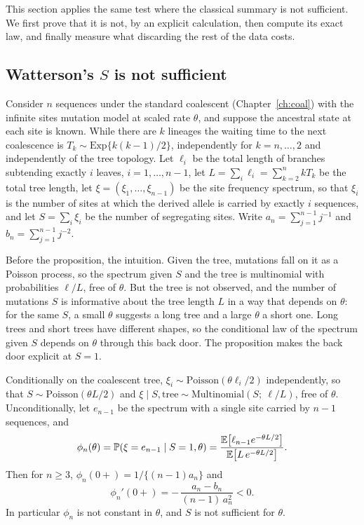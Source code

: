 This section applies the same test where the classical summary is not sufficient. We first
prove that it is not, by an explicit calculation, then compute its exact law, and finally
measure what discarding the rest of the data costs.

\subsection{Watterson's $S$ is not sufficient}

Consider $n$ sequences under the standard coalescent (Chapter~\ref{ch:coal}) with the
infinite sites mutation model at scaled rate $\theta$, and suppose the ancestral state at each
site is known. While there are $k$ lineages the waiting time to the next coalescence is
$T_k\sim\mathrm{Exp}\{k(k-1)/2\}$, independently for $k=n,\dots,2$ and independently of the
tree topology. Let $\ell_i$ be the total length of branches subtending exactly $i$ leaves,
$i=1,\dots,n-1$, let $L=\sum_i \ell_i=\sum_{k=2}^n kT_k$ be the total tree length, let
$\xi=(\xi_1,\dots,\xi_{n-1})$ be the site frequency spectrum, so that $\xi_i$ is the number of
sites at which the derived allele is carried by exactly $i$ sequences, and let
$S=\sum_i\xi_i$ be the number of segregating sites. Write
$a_n=\sum_{j=1}^{n-1}j^{-1}$ and $b_n=\sum_{j=1}^{n-1}j^{-2}$.

Before the proposition, the intuition. Given the tree, mutations fall on it as a Poisson
process, so the spectrum given $S$ and the tree is multinomial with probabilities $\ell/L$,
free of $\theta$. But the tree is not observed, and the number of mutations $S$ is
informative about the tree length $L$ in a way that depends on $\theta$: for the same $S$, a
small $\theta$ suggests a long tree and a large $\theta$ a short one. Long trees and short
trees have different shapes, so the conditional law of the spectrum given $S$ depends on
$\theta$ through this back door. The proposition makes the back door explicit at $S=1$.

\begin{proposition}
\label{suff:prop:notsuff}
Conditionally on the coalescent tree, $\xi_i\sim \mathrm{Poisson}(\theta\ell_i/2)$
independently, so that $S\sim\mathrm{Poisson}(\theta L/2)$ and
$\xi\mid S,\mathrm{tree} \sim \mathrm{Multinomial}(S;\ \ell/L)$, free of $\theta$.
Unconditionally, let $e_{n-1}$ be the spectrum with a single site carried by $n-1$
sequences, and
\[
\phi_n(\theta)=\mathbb{P}(\xi=e_{n-1}\mid S=1,\theta)
=\frac{\mathbb{E}\big[\ell_{n-1}e^{-\theta L/2}\big]}{\mathbb{E}\big[L\,e^{-\theta L/2}\big]} .
\]
Then for $n\ge3$, $\phi_n(0+)=1/\{(n-1)a_n\}$ and
\[
\phi_n'(0+)=-\,\frac{a_n-b_n}{(n-1)\,a_n^{2}}<0 .
\]
In particular $\phi_n$ is not constant in $\theta$, and $S$ is not sufficient for $\theta$.
\end{proposition}

